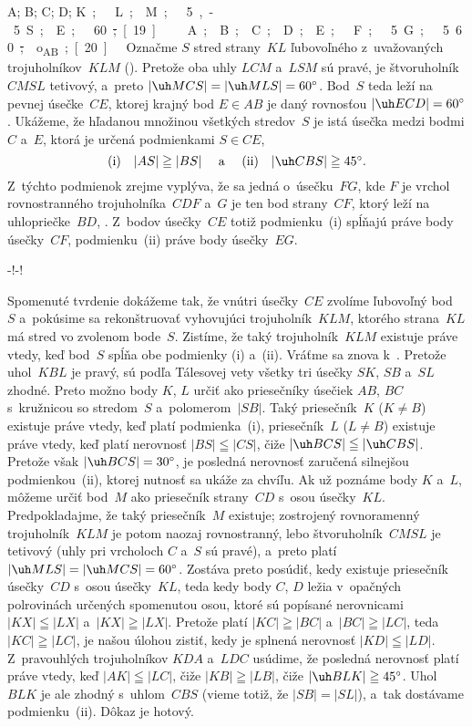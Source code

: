 {%
\fontplace
\rtpoint A; \ltpoint B; \lbpoint C; \rbpoint D;
\tpoint{}\unit K; \lbpoint{}\unit L; \rbpoint M;
\tpoint\xy.5,-.5 S; \tpoint E;
\cpoint\toleft\unit60\st;
[19] \hfil\Obr

\fontplace
\rtpoint A; \ltpoint B; \lbpoint C; \rbpoint D;
\tpoint E; \ltpoint\up\unit F; \lpoint\up.5\unit G;
\cpoint\toleft.5\unit60\st; \ltpoint o_{AB};
[20] \hfil\Obr

Označme $S$ stred strany~$KL$ ľubovoľného z~uvažovaných
trojuholníkov~$KLM$ (\obr). Pretože oba uhly $LCM$ a~$LSM$ sú
pravé, je štvoruholník~$CMSL$ tetivový, a~preto $|\uh
MCS|=|\uh MLS|=60^{\circ}$. Bod~$S$ teda leží na pevnej úsečke~$CE$,
ktorej krajný bod $E\in AB$ je daný rovnosťou $|\uh
ECD|=60^{\circ}$. Ukážeme, že hľadanou množinou všetkých stredov~$S$
je istá úsečka medzi bodmi $C$ a~$E$, ktorá je určená podmienkami
$S\in CE$,
$$
\centerline{(i)\quad$|AS|\geqq|BS|$ \quad a~\quad
(ii)\quad $|\uh CBS|\geqq45^{\circ}$.}
$$
Z~týchto podmienok zrejme vyplýva, že sa jedná o~úsečku~$FG$, kde
$F$ je vrchol rovnostranného trojuholníka~$CDF$ a~$G$ je ten bod
strany~$CF$, ktorý leží na uhlopriečke~$BD$, \obr. Z~bodov úsečky~$CE$
totiž podmienku~(i) spĺňajú práve body úsečky~$CF$,
podmienku~(ii) práve body úsečky~$EG$.

\midinsert
\centerline{\inspicture-!\hss\inspicture-!}
\endinsert

Spomenuté tvrdenie dokážeme tak, že vnútri úsečky~$CE$ zvolíme
ľubovoľný bod~$S$ a~pokúsime sa rekonštruovať vyhovujúci
trojuholník~$KLM$, ktorého strana~$KL$ má stred vo zvolenom bode~$S$.
Zistíme, že taký trojuholník~$KLM$ existuje práve vtedy, keď
bod~$S$ spĺňa obe podmienky (i) a~(ii). Vráťme sa znova
k~. Pretože uhol~$KBL$ je pravý, sú podľa Tálesovej vety
všetky tri úsečky $SK$, $SB$ a~$SL$ zhodné. Preto možno body
$K$, $L$ určiť ako priesečníky úsečiek $AB$, $BC$
s~kružnicou so stredom~$S$ a~polomerom~$|SB|$. Taký priesečník~$K$
($K\ne B$) existuje práve vtedy, keď platí podmienka~(i), priesečník~$L$
($L\ne B$) existuje práve vtedy, keď platí nerovnosť $|BS|\leqq|CS|$,
čiže $|\uh BCS|\leqq|\uh CBS|$. Pretože však $|\uh
BCS|=30^{\circ}$, je posledná nerovnosť zaručená silnejšou
podmienkou~(ii), ktorej nutnosť sa ukáže za chvíľu. Ak už poznáme
body $K$ a~$L$, môžeme určiť bod~$M$ ako priesečník strany~$CD$
s~osou úsečky~$KL$. Predpokladajme, že taký priesečník~$M$
existuje; zostrojený rovnoramenný trojuholník~$KLM$ je potom
naozaj rovnostranný, lebo štvoruholník~$CMSL$ je tetivový (uhly
pri vrcholoch $C$ a~$S$ sú pravé), a~preto platí $|\uh
MLS|=|\uh MCS|=60^{\circ}$. Zostáva preto posúdiť, kedy existuje
priesečník úsečky~$CD$ s~osou úsečky~$KL$, teda kedy body $C$, $D$
ležia v~opačných polrovinách určených spomenutou osou, ktoré sú
popísané nerovnicami $|KX|\leqq|LX|$ a~$|KX|\geqq|LX|$. Pretože
platí $|KC|\geqq|BC|$ a~$|BC|\geqq|LC|$, teda $|KC|\geqq|LC|$, je
našou úlohou zistiť, kedy je splnená nerovnosť $|KD|\leqq|LD|$.
Z~pravouhlých trojuholníkov $KDA$ a~$LDC$ usúdime, že posledná
nerovnosť platí práve vtedy, keď $|AK|\leqq|LC|$, čiže
$|KB|\geqq|LB|$, čiže $|\uh BLK|\geqq 45^{\circ}$. Uhol~$BLK$
je ale zhodný s~uhlom~$CBS$ (vieme totiž, že $|SB|=|SL|$), a~tak
dostávame podmienku~(ii). Dôkaz je hotový.}

